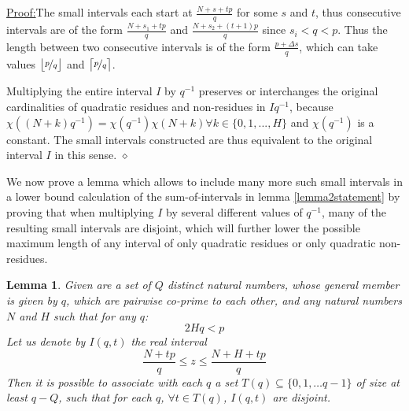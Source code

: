 \documentclass{report}
\newtheorem{lemma}{Lemma}
\newenvironment{claimproof}[1]{\vspace{2.5mm}\par\noindent\underline{Proof:}\space#1}{\hfill $\diamond$ \vspace{2.5mm} \par}
\begin{document}
\begin{claimproof}
The small intervals each start at $\frac{N+s+tp}{q}$ for some $s$ and $t$, thus consecutive intervals are of the form $\frac{N+s_1+tp}{q}$ and $\frac{N+s_2+(t+1)p}{q}$ since $s_i<q<p$. Thus the length between two consecutive intervals is of the form $\frac{p+\Delta s}{q}$, which can take values $\big \lfloor\nicefrac{p}{q}\big\rfloor$ and $\big \lceil\nicefrac{p}{q}\big\rceil$.

Multiplying the entire interval $I$ by $q^{-1}$ preserves or interchanges the original cardinalities of quadratic residues and non-residues in $Iq^{-1}$, because $\chi((N+k)q^{-1})=\chi(q^{-1})\chi(N+k)\forall k \in \{0,1,...,H\}$ and $\chi(q^{-1})$ is a constant. The small intervals constructed are thus equivalent to the original interval $I$ in this sense.
\end{claimproof}
We now prove a lemma which allows to include many more such small intervals in a lower bound calculation of the sum-of-intervals in lemma \ref{lemma2statement} by proving that when multiplying $I$ by several different values of $q^{-1}$, many of the resulting small intervals are disjoint, which will further lower the possible maximum length of any interval of only quadratic residues or only quadratic non-residues.
%
\begin{lemma}
\cite{burgess}Given are a set of $Q$ distinct natural numbers, whose general member is given by $q$, which are pairwise co-prime to each other, and any natural numbers $N$ and $H$ such that for any $q$:
\begin{equation} \label{lemma3cond}
2Hq<p
\end{equation}
Let us denote by $I(q,t)$ the real interval
$$\frac{N+tp}{q} \leq z \leq \frac{N+H+tp}{q}$$
Then it is possible to associate with each $q$ a set $T(q)\subseteq \{0,1,\ldots q-1\}$ of size at least $q-Q$, such that for each $q$, $\forall t\in T(q)$, $I(q,t)$ are disjoint.
\end{lemma}
\end{document}
